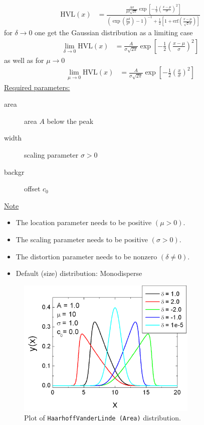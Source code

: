 \begin{align}
\textrm{HVL}(x) & =
\frac{
       \frac{A\sigma}{\mu\delta\sqrt{2\pi}}
       \exp\left[-\frac{1}{2}\left(\frac{x-\mu}{\sigma}\right)^2\right]
     }{
       \left(\exp\left(\frac{\mu\delta}{\sigma^2}\right)-1\right)^{-1}
       + \frac{1}{2}\left[1+\mathrm{erf}\left(\frac{x-\mu}{\sqrt{2}\sigma}\right)\right]
     }
\end{align}
for $\delta\rightarrow 0$ one get the Gaussian distribution as a limiting case
\begin{align}
\lim_{\delta \rightarrow 0} \textrm{HVL}(x) & =
       \frac{A}{\sigma\sqrt{2\pi}}
       \exp\left[-\frac{1}{2}\left(\frac{x-\mu}{\sigma}\right)^2\right]
\end{align}
as well as for $\mu\rightarrow 0$
\begin{align}
\lim_{\mu \rightarrow 0} \textrm{HVL}(x) & =
       \frac{A}{\sigma\sqrt{2\pi}}
       \exp\left[-\frac{1}{2}\left(\frac{x}{\sigma}\right)^2\right]
\end{align}
\underline{Required parameters:}
\begin{description}
    \item[area] area $A$ below the peak
    \item[width] scaling parameter $\sigma > 0$
    \item[backgr] offset $c_0$
\end{description}

\underline{Note}
\begin{itemize}
  \item The location parameter needs to be positive $(\mu > 0)$.
  \item The scaling parameter needs to be positive $(\sigma > 0)$.
  \item The distortion parameter needs to be nonzero $(\delta \neq 0)$.
  \item Default (size) distribution: Monodisperse
\end{itemize}

\begin{figure}[htb]
\begin{center}
\includegraphics[width=0.768\textwidth]{HaarhoffVanderLindeArea.png}
\end{center}
\caption{Plot of \texttt{HaarhoffVanderLinde (Area)} distribution.}
\label{fig:HaarhoffVanderLindeArea}
\end{figure}


